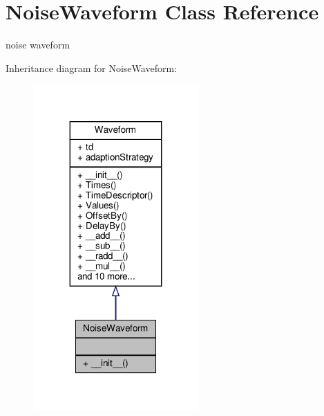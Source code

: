 \hypertarget{classSignalIntegrity_1_1TimeDomain_1_1Waveform_1_1NoiseWaveform_1_1NoiseWaveform}{}\section{Noise\+Waveform Class Reference}
\label{classSignalIntegrity_1_1TimeDomain_1_1Waveform_1_1NoiseWaveform_1_1NoiseWaveform}


noise waveform  




Inheritance diagram for Noise\+Waveform\+:
\nopagebreak
\begin{figure}[H]
\begin{center}
\leavevmode
\includegraphics[width=179pt]{classSignalIntegrity_1_1TimeDomain_1_1Waveform_1_1NoiseWaveform_1_1NoiseWaveform__inherit__graph}
\end{center}
\end{figure}


